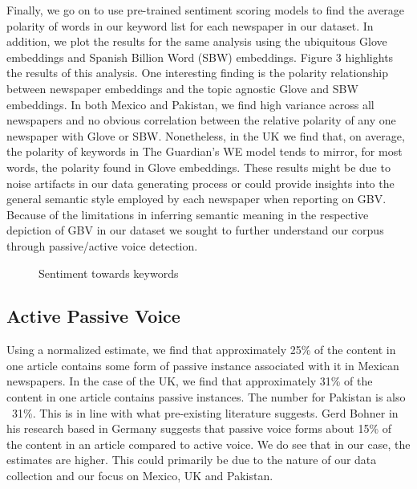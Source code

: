 \documentclass{article}
\begin{document}
{{Finally, we go on to use pre-trained sentiment scoring models to find the average polarity of words in our keyword list for each newspaper in our dataset. In addition, we plot the results for the same analysis using the ubiquitous Glove embeddings and Spanish Billion Word (SBW) embeddings. Figure 3 highlights the results of this analysis. One interesting finding is the polarity relationship between newspaper embeddings and the topic agnostic Glove and SBW embeddings. In both Mexico and Pakistan, we find high variance across all newspapers and no obvious correlation between the relative polarity of any one newspaper with Glove or SBW. Nonetheless, in the UK we find that, on average, the polarity of keywords in The Guardian’s WE model tends to mirror, for most words, the polarity found in Glove embeddings. These results might be due to noise artifacts in our data generating process or could provide insights into the general semantic style employed by each newspaper when reporting on GBV. Because of the limitations in inferring semantic meaning in the respective depiction of GBV in our dataset we sought to further understand our corpus through passive/active voice detection.

\begin{figure}[H]
	\caption{\label{fig:my-label1} Sentiment towards keywords}
\end{figure}

}


\subsection{Active Passive Voice}{


Using a normalized estimate, we find that approximately 25\% of the content in one article contains some form of passive instance associated with it in Mexican newspapers. In the case of the UK, we find that approximately 31\% of the content in one article contains passive instances. The number for Pakistan is also ~31\%. This is in line with what pre-existing literature suggests. Gerd Bohner in his research based in Germany suggests that passive voice forms about 15\% of the content in an article compared to active voice. We do see that in our case, the estimates are higher. This could primarily be due to the nature of our data collection and our focus on Mexico, UK and Pakistan.

}}
\end{document}
